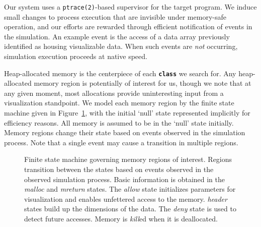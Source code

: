 Our system uses a \texttt{ptrace(2)}-based supervisor for the target
program.  We induce small changes to process execution that are
invisible under memory-safe operation, and our efforts are rewarded
through efficient notification of events in the simulation.  An example
event is the access of a data array previously identified as housing
visualizable data.
When such events are \emph{not} occurring, simulation execution
proceeds at native speed.


Heap-allocated memory is the centerpiece of each
\texttt{\textbf{class}} we search for.  Any heap-allocated memory
region is potentially of interest for us, though we note that at any
given moment, most allocations provide uninteresting input from a
visualization standpoint. We model each memory region by the finite
state machine given in
Figure~\ref{fig:fsm}, with the initial `null' state represented
implicitly for efficiency reasons.  All memory is assumed to be in the
`null' state initially.  Memory regions change their state based on
events observed in the simulation process.  Note that a single event
may cause a transition in multiple regions.

\begin{figure}
  \centering

  \caption{Finite state machine governing memory regions of interest.
  Regions transition between the states based on events observed in
  the observed simulation process.  Basic information is obtained in
  the \emph{malloc} and \emph{mreturn} states.  The \emph{allow} state
  initializes parameters for visualization and enables unfettered
  access to the memory. \emph{header} states build up the dimensions of
  the data.  The \emph{deny} state is used to detect future accesses.
  Memory is \emph{kill}ed when it is deallocated.}
  \label{fig:fsm}

\end{figure}

